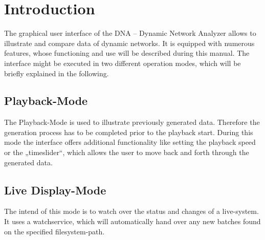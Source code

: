 \chapter{Introduction}
The graphical user interface of the DNA – Dynamic Network Analyzer allows to illustrate and compare data of dynamic networks. It is equipped with numerous features, whose functioning and use will be described during this manual. The interface might be executed in two different operation modes, which will be briefly explained in the following.

\section{Playback-Mode}
The Playback-Mode is used to illustrate previously generated data. Therefore the generation process has to be completed prior to the playback start. During this mode the interface offers additional functionality like setting the playback speed or the „timeslider“, which allows the user to move back and forth through the generated data.

\section{Live Display-Mode}
The intend of this mode is to watch over the status and changes of a live-system. It uses a watchservice, which will automatically hand over any new batches found on the specified filesystem-path.